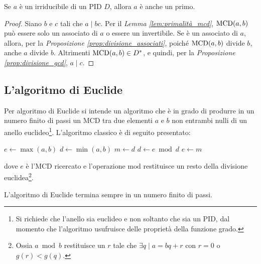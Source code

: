 \begin{theorem}
    \label{th:irriducibili_primi}
    Se $a$ è un irriducibile di un PID $D$, allora $a$ è anche un primo.
\end{theorem}

\begin{proof}
    Siano $b$ e $c$ tali che $a \mid bc$. Per il \textit{Lemma \ref{lem:primalità_mcd}},
    $\operatorname{MCD}(a,b)$ può essere solo un associato di $a$ o essere un invertibile. Se è
    un associato di $a$, allora, per la \textit{Proposizione \ref{prop:divisione_associati}}, poiché $\operatorname{MCD}(a,b)$ divide $b$, anche $a$ divide $b$.
    Altrimenti $\operatorname{MCD}(a,b) \in D^*$, e quindi, per la \textit{Proposizione \ref{prop:divisione_gcd}}, $a \mid c$.
\end{proof}

\subsection{L'algoritmo di Euclide}

Per algoritmo di Euclide si intende un algoritmo che è in grado di
produrre in un numero finito di passi un MCD tra due elementi
$a$ e $b$ non entrambi nulli di un anello euclideo\footnote{Si richiede che l'anello sia
    euclideo e non soltanto che sia un PID, dal momento che l'algoritmo
    usufruisce delle proprietà della funzione grado.}. L'algoritmo
classico è di seguito presentato:

\newpage

\begin{algorithm}
    $e \gets \max(a,b)$\;
    $d \gets \min(a,b)$\;
    \BlankLine\BlankLine
    {
        $m \gets d$\;
        $d \gets e \bmod d$\;
        $e \gets m$\;
    }
\end{algorithm}

dove $e$ è l'MCD ricercato e l'operazione $\mathrm{mod}$ restituisce un resto della
divisione euclidea\footnote{Ossia $a \bmod b$ restituisce un $r$ tale che $\exists q
        \mid a = bq+r$ con $r=0$ o $g(r)<g(q)$.}.

\begin{lemma}
    \label{lem:euclide_finito}
    L'algoritmo di Euclide termina sempre in un numero finito di passi.
\end{lemma}


